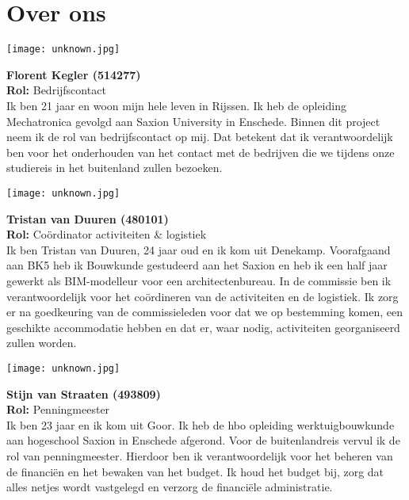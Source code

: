 \section*{Over ons}

\begin{minipage}{0.5\linewidth}
	\texttt{[image: unknown.jpg]}
\end{minipage}
\hfill
\vspace{1cm}
\begin{minipage}{\linewidth}
	\textbf{Florent Kegler (514277)} \\
	\textbf{Rol:} Bedrijfscontact \\
	Ik ben 21 jaar en woon mijn hele leven in Rijssen. Ik heb de opleiding Mechatronica gevolgd aan Saxion University in Enschede. Binnen dit project neem ik de rol van bedrijfscontact op mij. Dat betekent dat ik verantwoordelijk ben voor het onderhouden van het contact met de bedrijven die we tijdens onze studiereis in het buitenland zullen bezoeken.
\end{minipage}

\vspace{1cm}

\begin{minipage}{0.5\linewidth}
	\texttt{[image: unknown.jpg]}
\end{minipage}
\hfill
\vspace{1cm}
\begin{minipage}{\linewidth}
	\textbf{Tristan van Duuren (480101)} \\
	\textbf{Rol: } Coördinator activiteiten \& logistiek \\
	Ik ben Tristan van Duuren, 24 jaar oud en ik kom uit Denekamp. Voorafgaand aan BK5 heb ik Bouwkunde gestudeerd aan het Saxion en heb ik een half jaar gewerkt als BIM-modelleur voor een architectenbureau. In de commissie ben ik verantwoordelijk voor het coördineren van de activiteiten en de logistiek. Ik zorg er na goedkeuring van de commissieleden voor dat we op bestemming komen, een geschikte accommodatie hebben en dat er, waar nodig, activiteiten georganiseerd zullen worden. 
\end{minipage}

\begin{minipage}{0.5\linewidth}
	\texttt{[image: unknown.jpg]}
\end{minipage}
\hfill
\vspace{1cm}
\begin{minipage}{\linewidth}
	\textbf{Stijn van Straaten (493809)} \\
	\textbf{Rol: } Penningmeester \\
	Ik ben 23 jaar en ik kom uit Goor. Ik heb de hbo opleiding werktuigbouwkunde aan hogeschool Saxion in Enschede afgerond. Voor de buitenlandreis vervul ik de rol van penningmeester. Hierdoor ben ik verantwoordelijk voor het beheren van de financiën en het bewaken van het budget. Ik houd het budget bij, zorg dat alles netjes wordt vastgelegd en verzorg de financiële administratie.
\end{minipage}


